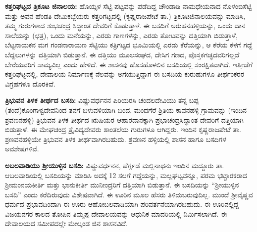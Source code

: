 \vskip 3pt

\textbf{ಕತ್ತರಿಘಟ್ಟದ ತ್ರಿಕೂಟ ಜಿನಾಲಯ:} ಹೊಯ್ಸಳ ಸೆಟ್ಟಿ ಪಟ್ಟವನ್ನು ಪಡೆದಿದ್ದ ಚೌಂಡಾಡಿ ನಾಮಧೇಯನಾದ ನೊಳಂಬಿಸೆಟ್ಟಿ ಮತ್ತು ಅವನ ಹೆಂಡತಿ ದೇಮಿಕಬ್ಬೆಯರು ಕತ್ತರಿಗಟ್ಟದಲ್ಲಿ (ಕೃಷ್ಣರಾಜಪೇಟೆ ತಾ.) ತ್ರಿಕೂಟಜಿನಾಲಯವನ್ನು ಮಾಡಿಸಿ, ತಮ್ಮ ಗುರುಗಳಾದ ಶುಭಚಂದ್ರ ಸಿದ್ಧಾಂತ ದೇವರಿಗೆ ಕೊಡುತ್ತಾಳೆ. ಈ ಬಸದಿಗೆ ಅರುಹನಹಳ್ಳಿಯನ್ನು, ಒಂದು ದಾನ ಸಾಲೆಯನ್ನು (ಛತ್ರ), ಒಂದು ಮನೆಯನ್ನು, ಎರಡು ಗಾಣಗಳನ್ನು, ಎರಡು ತೋಟವನ್ನು ದತ್ತಿಯಾಗಿ ಬಿಡುತ್ತಾಳೆ, ಬೆಟ್ಟನಾಯಕನ ಮಗ ಗಂಡನಾರಾಯಣ ಸೆಟ್ಟಿಯು ಕತ್ರಿಗಟ್ಟದ ಭೂಮಿಯಲ್ಲಿ ಎರಡು ಕೆರೆಯನ್ನು, ಆ ಕೆರೆಯ ಕೆಳಗೆ ಗದ್ದೆ ಬೆದ್ದಲುಗಳನ್ನು ದತ್ತಿಯಾಗಿ ಬಿಡುತ್ತಾನೆ. ಈ ದತ್ತಿಯು ಮೂಲಸಂಘದ, ದೇಸಿಗ ಗಣದ, ಪೊಸ್ತಕಗಚ್ಛದವರಿಗಲ್ಲದೆ ಬೇರೆಯವರಿಗೆ ಸಾಮ್ಯವಿಲ್ಲ ಎಂದು ಹೇಳಿದೆ. ಈ ಶಾಸನವು ಹೊಸಹೊಳಲಿನ ಬಸದಿಯಲ್ಲಿ ಸಂರಕ್ಷಿತವಾಗಿದೆ. ಇತ್ತೀಚೆಗೆ ಕತ್ತರಿಘಟ್ಟದಲ್ಲಿ, ದೇವಾಲಯ ನಿರ್ಮಾಣಕ್ಕೆ ನೆಲವನ್ನು ಅಗೆಯುತ್ತಿದ್ದಾಗ ಈ ಬಸದಿಯ ಕುರುಹುಗಳೂ ತೀರ್ಥಂಕರರ ವಿಗ್ರಹಗಳೂ ದೊರಕಿವೆ.

\vskip 3pt

\textbf{ತ್ರಿಭುವನ ತಿಳಕ ತೀರ್ಥದ ಬಸದಿ:} ವಿಷ್ಣುವರ್ಧನನ ಪಿರಿಯರಸಿ ಚಂದಲದೇವಿಯು ತನ್ನ ಬಪ್ಪ (ತಂದೆ)\break ಕೊಂಗಾಳ್ವದೇವನಿಂದ ತನಗೆ ಬಳುವಳಿಯಾಗಿ ಬಂದ, ಮಂದಗೆರೆ ಶ್ರಿತಿಯ ಕಾವನಹಳ್ಳಿ ಗ್ರಾಮವನ್ನು (ಇಂದಿನ ಶ್ರವಣನಹಳ್ಳಿ) ತ್ರಿಭುವನ ತಿಳಕ ತೀರ್ಥದ ಋಷಿಯರ ಆಹಾರದಾನಕ್ಕಾಗಿ ಪ್ರಭಾಚಂದ್ರಸಿದ್ಧಾಂತ ದೇವರಿಗೆ ದತ್ತಿಯಾಗಿ ಬಿಡುತ್ತಾಳೆ. ಈ ಮೇಘಚಂದ್ರ ತ್ರೈವಿದ್ಯದೇವರು ಶಾಂತಲೆಯ ಗುರುಗಳೂ ಆಗಿದ್ದರು. ಇಂದಿನ ಕೃಷ್ಣರಾಜಪೇಟೆ ತಾ. ಶ್ರಣವನಹಳ್ಳಿಯೇ ತ್ರಿಭುವನ ತಿಳಕ ತೀರ್ಥವಾಗಿರಬಹುದು. ಶ್ರವಣನ ಹಳ್ಳಿಯಲ್ಲಿ ಶಾಸನ ಹಾಗೂ ಬಸದಿಗಳ ಅವಶೇಷಗಳಿವೆ.

\vskip 3pt

\textbf{ಅಬಲವಾಡಿಯು ಶ‍್ರೀಯುಳ್ಳಿನ ಬಸದಿ:} ವಿಷ್ಣುವರ್ಧನನ, ಪೆರ್ಗ್ಗಡೆ ಮಲ್ಲಿನಾಥನು ಇಂದಿನ ಮದ್ದೂರು ತಾ. ಆಬಲವಾಡಿಯಲ್ಲಿ ಬಸದಿಯನ್ನು ಮಾಡಿಸಿ ಅದಕ್ಕೆ 12 ಸಲಗೆ ಗದ್ದೆಯನ್ನು, ಮಲ್ಲಘಟ್ಟವನ್ನೂ, ಪರಮ ಭಟ್ಟಾರಕರಾದ ಶ‍್ರೀಮಂನಯಕೀರ್ತಿ ಮತ್ತು ಭಾನುಕೀರ್ತಿ ಮುನೀಂದ್ರರಿಗೆ ದತ್ತಿಯಾಗಿ ಬಿಡುತ್ತಾನೆ. ಈ ಬಸದಿಯನ್ನು “ಶ‍್ರೀಯುಳ್ಳಿನ ಬಸದಿ” ಎಂದು ಕರೆದಿರುವುದು ವಿಶೇಷವಾಗಿದೆ. ಈ ಊರಿನ ಮೂಲ ಹೆಸರು ತಿಳಿದುಬರುವುದಿಲ್ಲ. ಮುಂದೆ ಶ‍್ರೀವೈಷ್ಣವ ಧರ್ಮದ ಪ್ರಭಾವದಿಂದಾಗಿ ಈ ಊರು ಆಹೋಬಲವಾಡಿಯಾಗಿ ಪರಿವರ್ತನೆಯಾಗಿರಬಹುದು. ಈ ಊರಿನಲ್ಲಿದ್ದ ವಿಜಯನಗರ ಕಾಲದ ತೋಪಿನ ತಿಮ್ಮಪ್ಪ ದೇವಾಲಯವನ್ನು ಆಧುನಿಕ ಮಾದರಿಯಲ್ಲಿ ನಿರ್ಮಿಸಲಾಗಿದೆ. ಈ ದೇವಾಲಯದ ಸಮೀಪದಲ್ಲೇ ಮೇಲ್ಕಂಡ ಜಿನ ಶಾಸನವಿದೆ.

